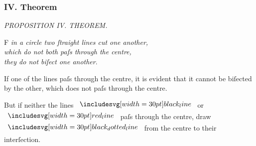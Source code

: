 \documentclass[12pt,preview]{standalone}
\begin{document}
\subsubsection{IV. Theorem}

\begin{minipage}[t]{0.33\textwidth}
    \vspace{40pt}
    
\end{minipage}%
\hfill
\begin{minipage}[t]{0.64\textwidth}
    \vspace{0pt}

    \begin{center}
        \textit{PROPOSITION IV. THEOREM.}\label{book3pr4} \\
    \end{center}

    \hfill

    \begin{center}
        \raggedright \lettrine[lines=4, loversize=1, nindent=0pt]{}{}F \textit{in a circle two ſtraight lines cut one another,\\ which do not both paſs through the centre,\\ they do not biſect one another}.
    \end{center}

    \hfill

    \hfill

    \vspace{1ex}\raggedright If one of the lines paſs through the centre, it is evident that it cannot be biſected by the other, which does not paſs through the centre.

    \hfill

    \begin{center}
        But if neither the lines $\blackline$ or $\redline$ paſs through the centre, draw\\
        $\dottedblackline$ from the centre to their interſection.
    \end{center}

    \hfill


\end{minipage}
\end{document}
